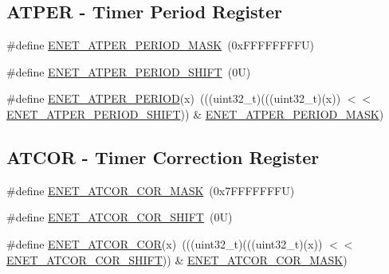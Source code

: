 \subsection*{A\+T\+P\+ER -\/ Timer Period Register}
\begin{DoxyCompactItemize}
\item 
\#define \mbox{\hyperlink{group___e_n_e_t___register___masks_ga86f89e80c9b16d19744517af3d775f57}{E\+N\+E\+T\+\_\+\+A\+T\+P\+E\+R\+\_\+\+P\+E\+R\+I\+O\+D\+\_\+\+M\+A\+SK}}~(0x\+F\+F\+F\+F\+F\+F\+F\+F\+U)
\item 
\#define \mbox{\hyperlink{group___e_n_e_t___register___masks_gadef7d222ae0f44afa4379b3a27e89978}{E\+N\+E\+T\+\_\+\+A\+T\+P\+E\+R\+\_\+\+P\+E\+R\+I\+O\+D\+\_\+\+S\+H\+I\+FT}}~(0\+U)
\item 
\#define \mbox{\hyperlink{group___e_n_e_t___register___masks_gab2418a9dfbf8e0b5c7dd20714c14f791}{E\+N\+E\+T\+\_\+\+A\+T\+P\+E\+R\+\_\+\+P\+E\+R\+I\+OD}}(x)~(((uint32\+\_\+t)(((uint32\+\_\+t)(x)) $<$$<$ \mbox{\hyperlink{group___e_n_e_t___register___masks_gadef7d222ae0f44afa4379b3a27e89978}{E\+N\+E\+T\+\_\+\+A\+T\+P\+E\+R\+\_\+\+P\+E\+R\+I\+O\+D\+\_\+\+S\+H\+I\+FT}})) \& \mbox{\hyperlink{group___e_n_e_t___register___masks_ga86f89e80c9b16d19744517af3d775f57}{E\+N\+E\+T\+\_\+\+A\+T\+P\+E\+R\+\_\+\+P\+E\+R\+I\+O\+D\+\_\+\+M\+A\+SK}})
\end{DoxyCompactItemize}
\subsection*{A\+T\+C\+OR -\/ Timer Correction Register}
\begin{DoxyCompactItemize}
\item 
\#define \mbox{\hyperlink{group___e_n_e_t___register___masks_gacbd6f1547546f95562a646e40ab095d3}{E\+N\+E\+T\+\_\+\+A\+T\+C\+O\+R\+\_\+\+C\+O\+R\+\_\+\+M\+A\+SK}}~(0x7\+F\+F\+F\+F\+F\+F\+F\+U)
\item 
\#define \mbox{\hyperlink{group___e_n_e_t___register___masks_ga5b25c79c73597f4700107d56a1cdcd91}{E\+N\+E\+T\+\_\+\+A\+T\+C\+O\+R\+\_\+\+C\+O\+R\+\_\+\+S\+H\+I\+FT}}~(0\+U)
\item 
\#define \mbox{\hyperlink{group___e_n_e_t___register___masks_ga97bb4a4c75d59a21afb9972077f03374}{E\+N\+E\+T\+\_\+\+A\+T\+C\+O\+R\+\_\+\+C\+OR}}(x)~(((uint32\+\_\+t)(((uint32\+\_\+t)(x)) $<$$<$ \mbox{\hyperlink{group___e_n_e_t___register___masks_ga5b25c79c73597f4700107d56a1cdcd91}{E\+N\+E\+T\+\_\+\+A\+T\+C\+O\+R\+\_\+\+C\+O\+R\+\_\+\+S\+H\+I\+FT}})) \& \mbox{\hyperlink{group___e_n_e_t___register___masks_gacbd6f1547546f95562a646e40ab095d3}{E\+N\+E\+T\+\_\+\+A\+T\+C\+O\+R\+\_\+\+C\+O\+R\+\_\+\+M\+A\+SK}})
\end{DoxyCompactItemize}
